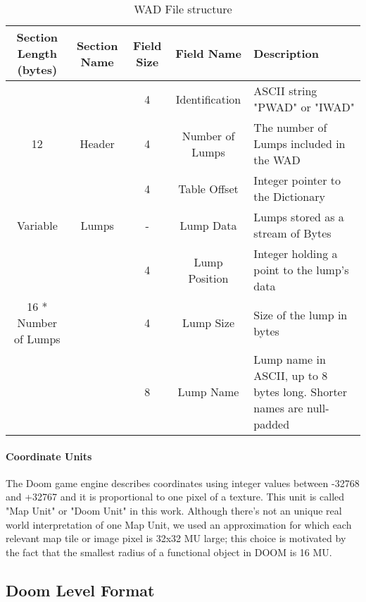 \begin{table}[b]
	\centering
	\begin{tabularx}{\textwidth}{| c | c | c | c | X | }
		\hline
		Section Length (bytes) & Section Name & Field Size & Field Name & Description \\
		\hline
		   &   & 4 & Identification & ASCII string "PWAD" or "IWAD" \\ \cline{3-5}
		12 &     Header			  & 4 & Number of Lumps & The number of Lumps included in the WAD \\  \cline{3-5}
		&   						  & 4 & Table Offset & Integer pointer to the Dictionary \\ \cline{3-5}
		\hline
		Variable& Lumps & - & Lump Data & Lumps stored as a stream of Bytes \\
		\hline
		&                              & 4 & Lump Position & Integer holding a point to the lump's data \\ \cline{3-5}
		16 * Number of Lumps  & \multirow{3}{*}{}{Directory} & 4 & Lump Size & Size of the lump in bytes \\ \cline{3-5}
		&                              & 8 & Lump Name & Lump name in ASCII, up to 8 bytes long. Shorter names are null-padded \\ \cline{3-5}
		\hline
	\end{tabularx}
\caption{WAD File structure}
\label{tab:WADStructure}
\end{table}

\paragraph{Coordinate Units} \label{par:coords} The Doom game engine describes coordinates using integer values between -32768 and +32767 and it is proportional to one pixel of a texture. This unit is called "Map Unit" or "Doom Unit" in this work. Although there's not an unique real world interpretation of one Map Unit, we used an approximation for which each relevant map tile or image pixel is 32x32 MU large; this choice is motivated by the fact that the smallest radius of a functional object in DOOM is 16 MU. 

\newpage

\subsection{Doom Level Format}
